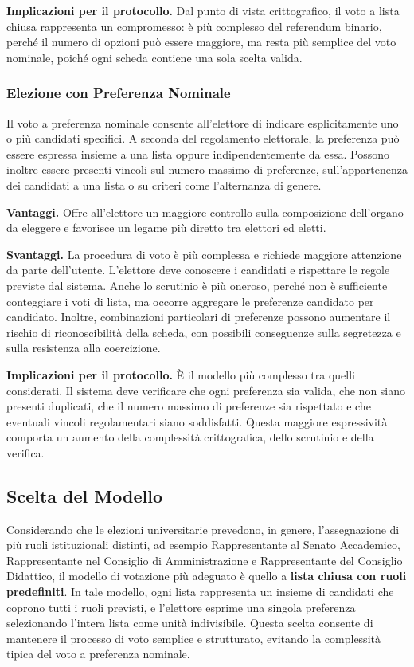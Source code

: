 \documentclass[12pt,a4paper]{article}
\begin{document}
\textbf{Implicazioni per il protocollo.} Dal punto di vista crittografico, il voto a lista chiusa rappresenta un
compromesso: è più complesso del referendum binario, perché il numero di opzioni può essere maggiore, ma resta
più semplice del voto nominale, poiché ogni scheda contiene una sola scelta valida.

\subsubsection{Elezione con Preferenza Nominale}

Il voto a preferenza nominale consente all’elettore di indicare esplicitamente uno o più candidati specifici.
A seconda del regolamento elettorale, la preferenza può essere espressa insieme a una lista oppure indipendentemente da essa.
Possono inoltre essere presenti vincoli sul numero massimo di preferenze, sull’appartenenza dei candidati a una lista o su criteri come l’alternanza di genere.

\textbf{Vantaggi.} Offre all'elettore un maggiore controllo sulla composizione dell'organo da
eleggere e favorisce un legame più diretto tra elettori ed eletti.

\textbf{Svantaggi.} La procedura di voto è più complessa e richiede maggiore attenzione da parte
dell'utente. L'elettore deve conoscere i candidati e rispettare le regole previste dal sistema.
Anche lo scrutinio è più oneroso, perché non è sufficiente conteggiare i voti di lista, ma occorre
aggregare le preferenze candidato per candidato. Inoltre, combinazioni particolari di preferenze
possono aumentare il rischio di riconoscibilità della scheda, con possibili conseguenze sulla
segretezza e sulla resistenza alla coercizione.

\textbf{Implicazioni per il protocollo.} È il modello più complesso tra quelli considerati. Il
sistema deve verificare che ogni preferenza sia valida, che non siano presenti duplicati, che il
numero massimo di preferenze sia rispettato e che eventuali vincoli regolamentari siano soddisfatti.
Questa maggiore espressività comporta un aumento della complessità crittografica, dello scrutinio
e della verifica.

\subsection{Scelta del Modello}

Considerando che le elezioni universitarie prevedono, in genere, l'assegnazione di più ruoli
istituzionali distinti, ad esempio Rappresentante al Senato Accademico, Rappresentante nel
Consiglio di Amministrazione e Rappresentante del Consiglio Didattico, il modello di votazione
più adeguato è quello a \textbf{lista chiusa con ruoli predefiniti}. In tale modello, ogni lista
rappresenta un insieme di candidati che coprono tutti i ruoli previsti, e l'elettore esprime
una singola preferenza selezionando l'intera lista come unità indivisibile. Questa scelta
consente di mantenere il processo di voto semplice e strutturato, evitando la complessità tipica
del voto a preferenza nominale.
\end{document}
